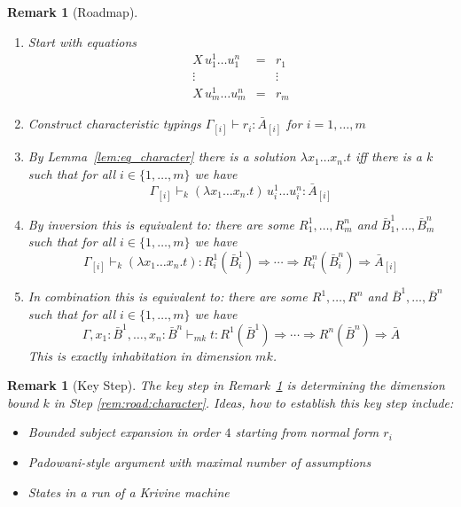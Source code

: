 \documentclass[10pt,a4paper]{article}
\theoremstyle{plain}%
\newtheorem{remark}[theorem]{Remark}
\begin{document}
\begin{remark}[Roadmap]\label{rem:road}~
\begin{enumerate}
\item Start with equations
\[
\begin{array}{lll}
X\,u_1^1\ldots u_1^n &=& r_1\\
\vdots&&\vdots\\
X\,u_m^1\ldots u_m^n &=& r_m
\end{array}
\]
\item Construct characteristic typings
$\Gamma_{[i]} \vdash r_i : \bar{A}_{[i]}$ for $i = 1, \ldots, m$
\item\label{rem:road:character}
By Lemma~\ref{lem:eq_character} there is a solution $\lambda x_1 \ldots x_n.t$ iff there is a $k$ such that for all $i \in \{1, \ldots, m\}$ we have \[\Gamma_{[i]} \vdash_k (\lambda x_1 \ldots x_n.t)\,u_i^1\ldots u_i^n : \bar{A}_{[i]}\]
\item By inversion this is equivalent to: there are some $R_1^1, \ldots, R_m^n$ and $\bar{B}_1^1, \ldots, \bar{B}_m^n$ such that for all $i \in \{1, \ldots, m\}$ we have
\[\Gamma_{[i]} \vdash_k (\lambda x_1 \ldots x_n.t) : R_i^1(\bar{B}_i^1) \Rightarrow \cdots \Rightarrow R_i^n(\bar{B}_i^n) \Rightarrow \bar{A}_{[i]}\]
\item In combination this is equivalent to: there are some  $R^1, \ldots, R^n$ and $\bar{B}^1, \ldots, \bar{B}^n$ such that for all $i \in \{1, \ldots, m\}$ we have
\[\Gamma, x_1 : \bar{B}^1, \ldots, x_n : \bar{B}^n \vdash_{mk} t : R^1(\bar{B}^1) \Rightarrow \cdots \Rightarrow R^n(\bar{B}^n) \Rightarrow \bar{A}\]
This is exactly inhabitation in dimension $mk$.
\end{enumerate}
\end{remark}

\begin{remark}[Key Step]
The key step in Remark~\ref{rem:road} is determining the dimension bound $k$ in Step \ref{rem:road:character}.
Ideas, how to establish this key step include:
\begin{itemize}
\item Bounded subject expansion in order $4$ starting from normal form $r_i$
\item Padowani-style argument with maximal number of assumptions
\item States in a run of a Krivine machine
\end{itemize}
\end{remark}

\newpage
\end{document}
